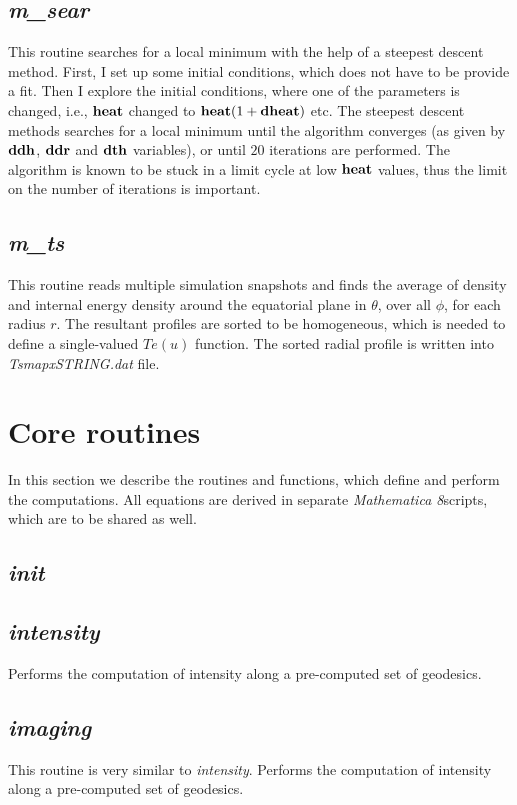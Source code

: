 \documentclass{emulateapj}
\newcommand{\mat}{\textit{Mathematica 8}}
\begin{document}
\subsection{\textit{m\_sear}}
This routine searches for a local minimum with the help of a steepest descent method.
First, I set up some initial conditions, which does not have to be provide a fit.
Then I explore the initial conditions, where one of the parameters is changed, i.e., ${\bf heat}$ changed to ${\bf heat}(1+{\bf dheat})$
etc. The steepest descent methods searches for a local minimum until the algorithm converges (as given by
${\bf ddh}$, ${\bf ddr}$ and ${\bf dth}$ variables), or until $20$ iterations are performed.
The algorithm is known to be stuck in a limit cycle at low ${\bf heat}$ values, thus the limit on the number of
iterations is important.

\subsection{\textit{m\_ts}}
This routine reads multiple simulation snapshots and finds the average of density and internal energy density
around the equatorial plane in $\theta$, over all $\phi$, for each radius $r$.
The resultant profiles are sorted to be homogeneous, which is needed to define a single-valued $Te(u)$ function.
The sorted radial profile is written into \textit{TsmapxSTRING.dat} file.

\section{Core routines}
In this section we describe the routines and functions, which define and perform the computations.
All equations are derived in separate \mat  scripts, which are to be shared as well.
\subsection{\textit{init}}
\subsection{\textit{intensity}}
Performs the computation of intensity along a pre-computed set of geodesics.
\subsection{\textit{imaging}}
This routine is very similar to \textit{intensity}.
Performs the computation of intensity along a pre-computed set of geodesics.
\end{document}
